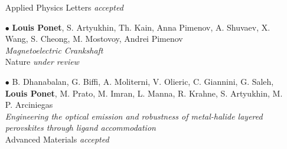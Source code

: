 \begin{itemize}
	Applied Physics Letters {\it accepted}
	\item[$\bullet$]
	{\bf Louis Ponet}, S. Artyukhin, Th. Kain, Anna Pimenov, A. Shuvaev, X. Wang, S. Cheong, M. Mostovoy, Andrei Pimenov\\
	{\it Magnetoelectric Crankshaft}\\
	Nature {\it under review}
	\item[$\bullet$]
	B. Dhanabalan, G. Biffi, A. Moliterni, V. Olieric, C. Giannini, G. Saleh, {\bf Louis Ponet}, M. Prato, M. Imran, L. Manna, R. Krahne, S. Artyukhin, M. P. Arciniegas\\
	{\it Engineering the optical emission and robustness of metal-halide layered perovskites through ligand accommodation}\\
	Advanced Materials {\it accepted}
\end{itemize}
